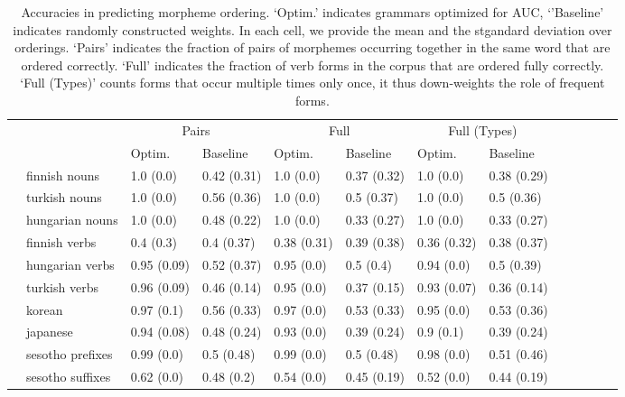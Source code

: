 \documentclass[11pt,letterpaper]{article}
\begin{document}
\begin{table}[]
    \centering
    \begin{tabular}{l|l|ll|lllllllll}
    &     &    \multicolumn{2}{c|}{Pairs} & \multicolumn{2}{c|}{Full} & \multicolumn{2}{c}{Full (Types)} \\
     &   &     Optim. & Baseline & Optim. & Baseline & Optim. & Baseline \\ \hline
 & finnish nouns & 1.0 (0.0) & 0.42 (0.31) & 1.0 (0.0) & 0.37 (0.32) & 1.0 (0.0) & 0.38 (0.29) \\
 & turkish nouns & 1.0 (0.0) & 0.56 (0.36) & 1.0 (0.0) & 0.5 (0.37) & 1.0 (0.0) & 0.5 (0.36) \\
 & hungarian nouns & 1.0 (0.0) & 0.48 (0.22) & 1.0 (0.0) & 0.33 (0.27) & 1.0 (0.0) & 0.33 (0.27) \\
 \hline
 & finnish verbs & 0.4 (0.3) & 0.4 (0.37) & 0.38 (0.31) & 0.39 (0.38) & 0.36 (0.32) & 0.38 (0.37) \\
 & hungarian verbs & 0.95 (0.09) & 0.52 (0.37) & 0.95 (0.0) & 0.5 (0.4) & 0.94 (0.0) & 0.5 (0.39) \\
 & turkish verbs & 0.96 (0.09) & 0.46 (0.14) & 0.95 (0.0) & 0.37 (0.15) & 0.93 (0.07) & 0.36 (0.14) \\
 & korean & 0.97 (0.1) & 0.56 (0.33) & 0.97 (0.0) & 0.53 (0.33) & 0.95 (0.0) & 0.53 (0.36) \\
 & japanese & 0.94 (0.08) & 0.48 (0.24) & 0.93 (0.0) & 0.39 (0.24) & 0.9 (0.1) & 0.39 (0.24) \\
 & sesotho prefixes & 0.99 (0.0) & 0.5 (0.48) & 0.99 (0.0) & 0.5 (0.48) & 0.98 (0.0) & 0.51 (0.46) \\
 & sesotho suffixes & 0.62 (0.0) & 0.48 (0.2) & 0.54 (0.0) & 0.45 (0.19) & 0.52 (0.0) & 0.44 (0.19) \\
    \end{tabular}
    \caption{Accuracies in predicting morpheme ordering. `Optim.' indicates grammars optimized for AUC, `'Baseline' indicates randomly constructed weights.
    In each cell, we provide the mean and the stgandard deviation over orderings. `Pairs' indicates the fraction of pairs of morphemes occurring together in the same word that are ordered correctly. `Full' indicates the fraction of verb forms in the corpus that are ordered fully correctly. `Full (Types)' counts forms that occur multiple times only once, it thus down-weights the role of frequent forms.}
    \label{tab:my_label}
\end{table}
\end{document}
